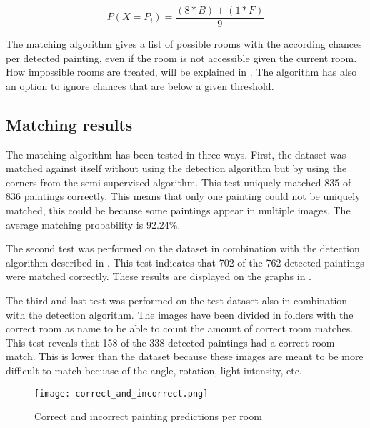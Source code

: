 \begin{equation}
    \label{eq:histogram-score}
    P(X = P_{i}) = \frac{(8 * B) + (1 * F)}{9}
\end{equation}

The matching algorithm gives a list of possible rooms with the according chances per detected painting, even if the room is not accessible given the current room. How impossible rooms are treated, will be explained in . The algorithm has also an option to ignore chances that are below a given threshold.

\subsection{Matching results}
The matching algorithm has been tested in three ways. First, the dataset was matched against itself without using the detection algorithm but by using the corners from the semi-supervised algorithm. This test uniquely matched 835 of 836 paintings correctly. This means that only one painting could not be uniquely matched, this could be because some paintings appear in multiple images. The average matching probability is 92.24\%.

The second test was performed on the dataset in combination with the detection algorithm described in . This test indicates that 702 of the 762 detected paintings were matched correctly. These results are displayed on the graphs in .

The third and last test was performed on the test dataset also in combination with the detection algorithm. The images have been divided in folders with the correct room as name to be able to count the amount of correct room matches. This test reveals that 158 of the 338 detected paintings had a correct room match. This is lower than the dataset because these images are meant to be more difficult to match becuase of the angle, rotation, light intensity, etc.

\begin{figure}
    \centering
    \texttt{[image: correct\_and\_incorrect.png]}

    \caption{Correct and incorrect painting predictions per room}
    \label{fig:correct-incorrect-paintings}
\end{figure}
